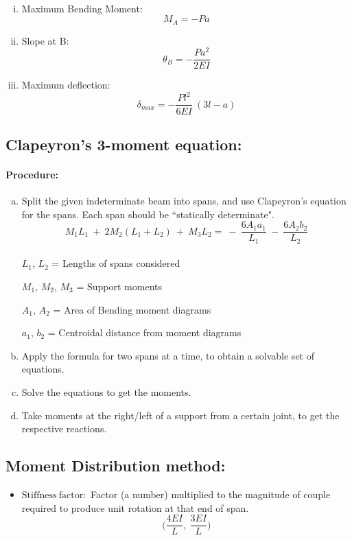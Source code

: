 \documentclass{article}
\begin{document}
{
\\
\begin{enumerate}[(i)]
\item Maximum Bending Moment: {\LARGE $$M_A=-Pa$$}
\item Slope at B: {\LARGE $$\theta_B=-\frac{Pa^2}{2EI}$$}
\item Maximum deflection:
{\LARGE $$\delta_{max}=-\frac{Pl^2}{6EI}\ (3l-a)$$}
\end{enumerate}
\newpage
\subsection{\LARGE Clapeyron's 3-moment equation:}
\paragraph{\Large Procedure:}
\begin{enumerate}[(a)]
\item Split the given indeterminate beam into spans, and use Clapeyron's equation for the spans. Each span should be ``statically determinate".
{\LARGE $$M_1L_1\ +\ 2M_2(L_1+L_2)\ +\ M_3L_2=\ -\ \frac{6A_1a_1}{L_1}\ -\ \frac{6A_2b_2}{L_2}$$}
\\
{\LARGE $L_1$, $L_2$} = Lengths of spans considered

{\LARGE $M_1$, $M_2$, $M_3$} = Support moments

{\LARGE $A_1$, $A_2$} = Area of Bending moment diagrams

{\LARGE $a_1$, $b_2$} = Centroidal distance from moment diagrams
\\
\item Apply the formula for two spans at a time, to obtain a solvable set of equations.
\item Solve the equations to get the moments.
\item Take moments at the right/left of a support from a certain joint, to get the respective reactions.
\end{enumerate}
\subsection{\LARGE Moment Distribution method:}
\begin{itemize}
\item {\LARGE $\mathrm{Stiffness\ factor:}$} Factor (a number) multiplied to the magnitude of couple required to produce unit rotation at that end of span.
{\LARGE $$\bigg(\frac{4EI}{L},\ \frac{3EI}{L}\bigg)$$}

\end{itemize}}
\end{document}
